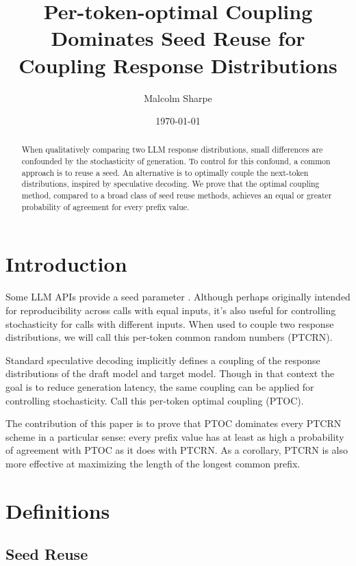 \documentclass{article}
\title{Per-token-optimal Coupling Dominates Seed Reuse for Coupling Response Distributions}
\author{Malcolm Sharpe}
\date{\today}
\begin{document}
\maketitle

\begin{abstract}
When qualitatively comparing two LLM response distributions, small differences are confounded by the stochasticity of generation. To control for this confound, a common approach is to reuse a seed. An alternative is to optimally couple the next-token distributions, inspired by speculative decoding. We prove that the optimal coupling method, compared to a broad class of seed reuse methods, achieves an equal or greater probability of agreement for every prefix value.
\end{abstract}

\section*{Introduction}

Some LLM APIs provide a seed parameter \cite{sharpe2024blogseedparam}.
Although perhaps originally intended for reproducibility across calls with equal inputs,
it's also useful for controlling stochasticity for calls with different inputs.
When used to couple two response distributions,
we will call this per-token common random numbers (PTCRN).

Standard speculative decoding \cite{leviathan2023fast} \cite{chen2023acceleratinglargelanguagemodel} implicitly defines a coupling of the response distributions of the draft model and target model.
Though in that context the goal is to reduce generation latency,
the same coupling can be applied for controlling stochasticity.
Call this per-token optimal coupling (PTOC).

The contribution of this paper is to prove that PTOC dominates every PTCRN scheme in a particular sense:
every prefix value has at least as high a probability of agreement with PTOC as it does with PTCRN.
As a corollary, PTCRN is also more effective at maximizing the length of the longest common prefix.

\section*{Definitions}

\subsection*{Seed Reuse}
\end{document}
